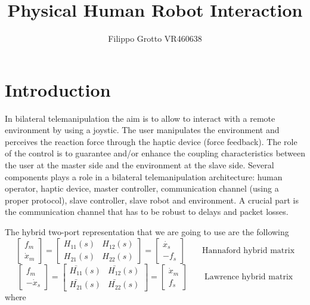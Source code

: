 \documentclass[a4paper,12pt]{article}
\begin{document}
\author{Filippo Grotto VR460638}

\title{Physical Human Robot Interaction}

\maketitle
\tableofcontents

\section{Introduction}
In bilateral telemanipulation the aim is to allow to interact with a remote environment by using a joystic. The user manipulates the environment and perceives the reaction force through the haptic device (force feedback). The role of the control is to guarantee and/or enhance the coupling characteristics between the user at the master side and the environment at the slave side. Several components plays a role in a bilateral telemanipulation architecture: human operator, haptic device, master controller, communication channel (using a proper protocol), slave controller, slave robot and environment. A crucial part is the communication channel that has to be robust to delays and packet losses. 

\bigskip
\noindent The hybrid two-port representation that we are going to use are the following
\[
    \begin{bmatrix}
        f_m \\ \dot{x}_m
    \end{bmatrix} = \begin{bmatrix}
        H_{11}(s) & H_{12}(s) \\ H_{21}(s) & H_{22}(s)
    \end{bmatrix} = \begin{bmatrix}
        \dot{x_s} \\ -f_s
    \end{bmatrix} \qquad \text{Hannaford hybrid matrix}
\]
\[
    \begin{bmatrix}
        f_m \\ -\dot{x}_s
    \end{bmatrix} = \begin{bmatrix}
        \bar{H_{11}}(s) & \bar{H_{12}}(s) \\ \bar{H_{21}}(s) &\bar{ H_{22}}(s)
    \end{bmatrix} = \begin{bmatrix}
        \dot{x}_m \\ f_s
    \end{bmatrix} \qquad \text{Lawrence hybrid matrix}
\]
where 
\end{document}

